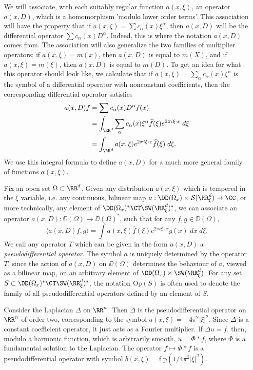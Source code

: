 We will associate, with each suitably regular function $a(x,\xi)$, an operator $a(x,D)$, which is a homomorphism 'modulo lower order terms'. This association will have the property that if $a(x,\xi) = \sum c_\alpha(x) \xi^\alpha$, then $a(x,D)$ will be the differential operator $\sum c_\alpha(x) D^\alpha$. Indeed, this is where the notation $a(x,D)$ comes from. The association will also generalize the two families of multiplier operators; if $a(x,\xi) = m(x)$, then $a(x,D)$ is equal to $m(X)$, and if $a(x,\xi) = m(\xi)$, then $a(x,D)$ is equal to $m(D)$. To get an idea for what this operator should look like, we calculate that if $a(x,\xi) = \sum_\alpha c_\alpha(x) \xi^\alpha$ is the symbol of a differential operator with nonconstant coefficients, then the corresponding differential operator satisfies
%
\begin{align*}
    a(x,D) f &= \sum c_\alpha(x) D^\alpha f(x)\\
    &= \int_{\RR^d} \sum_\alpha c_\alpha(x) \xi^\alpha \widehat{f}(\xi) e^{2 \pi i \xi \cdot x}\; d\xi\\
    &= \int_{\RR^d} a(x,\xi) e^{2 \pi i \xi \cdot x} \widehat{f}(\xi)\; d\xi.
\end{align*}
%
We use this integral formula to define $a(x,D)$ for a much more general family of functions $a(x,\xi)$.

Fix an open set $\Omega \subset \RR^d$. Given any distribution $a(x,\xi)$ which is tempered in the $\xi$ variable, i.e. any continuous, bilinear map $a: \DD(\Omega_x) \times \mathcal{S}(\RR^d_\xi) \to \CC$, or more technically, any element of $\DD(\Omega_x)^* \CT \SW(\RR^d_\xi)^*$, we can associate an operator $a(x,D): \DD(\Omega) \to \DD(\Omega)^*$, such that for any $f,g \in \DD(\Omega)$,
%
\[ \langle a(x,D) f, g \rangle = \int a(x,\xi) \widehat{f}(\xi) e^{2 \pi i \xi \cdot x} g(x)\; dx\; d\xi. \]
%
We call any operator $T$ which can be given in the form $a(x,D)$ a \emph{pseudodifferential operator}. The symbol $a$ is uniquely determined by the operator $T$, since the action of $a(x,D)$ on $\DD(\Omega)$ determines the behaviour of $a$, viewed as a bilinear map, on an arbitrary element of $\DD(\Omega_x) \times \SW(\RR^d_\xi)$. For any set $S \subset \DD(\Omega_x)^* \CT \SW(\RR^d_\xi)^*$, the notation $\text{Op}(S)$ is often used to denote the family of all pseudodifferential operators defined by an element of $S$.

\begin{example}
    Consider the Laplacian $\Delta$ on $\RR^n$. Then $\Delta$ is the pseudodifferential operator on $\RR^n$ of order two, corresponding to the symbol $a(x,\xi) = - 4\pi^2 |\xi|^2$. Since $\Delta$ is a constant coefficient operator, it just acts as a Fourier multiplier. If $\Delta u = f$, then, modulo a harmonic function, which is arbitrarily smooth, $u = \Phi * f$, where $\Phi$ is a fundamental solution to the Laplacian. The operator $f \mapsto \Phi * f$ is a pseudodifferential operator with symbol $b(x,\xi) = \text{f.p}(1/4\pi^2 |\xi|^2)$. 
\end{example}

